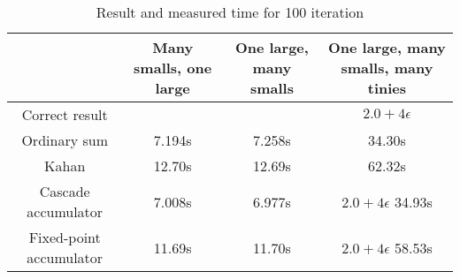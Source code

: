 \documentclass[conference]{IEEEtran}
\begin{document}
\begin{table}[!t]
\renewcommand{\arraystretch}{1.3}
\caption{Result and measured time for 100 iteration}
\label{tab:measurement}
\begin{tabular}{|c|c|c|c|}
\hline
	\parbox[]{1.8cm}{ \center } & 
	\parbox[]{1.7cm}{ \centering Many smalls, one large } & 
	\parbox[]{1.7cm}{ \center One large, many smalls } & 
	\parbox[]{1.7cm}{ \center One large, many smalls, many tinies \linebreak } \\
\hline
	Correct result &
	\parbox[]{1.7cm}{  \linebreak} &
	\parbox[]{1.7cm}{  \linebreak} &
	\parbox[]{1.7cm}{ \center $2.0 + 4\epsilon$ \linebreak} \\
\hline
	Ordinary sum &
	\parbox[]{1.7cm}{  \linebreak 7.194s \linebreak} &
	\parbox[]{1.7cm}{  \linebreak 7.258s \linebreak} &
	\parbox[]{1.7cm}{  \linebreak 34.30s \linebreak} \\
\hline
	Kahan &
	\parbox[]{1.7cm}{  \linebreak 12.70s \linebreak} &
	\parbox[]{1.7cm}{  \linebreak 12.69s \linebreak} &
	\parbox[]{1.7cm}{  \linebreak 62.32s \linebreak} \\
\hline
	\parbox[]{1.7cm}{ \center Cascade \linebreak accumulator \linebreak} &
	\parbox[]{1.7cm}{  \linebreak 7.008s \linebreak} &
	\parbox[]{1.7cm}{  \linebreak 6.977s \linebreak} &
	\parbox[]{1.7cm}{ \center $2.0 + 4\epsilon$ \linebreak 34.93s \linebreak} \\
\hline
	\parbox[]{1.7cm}{ \center Fixed-point \linebreak accumulator \linebreak} &
	\parbox[]{1.7cm}{  \linebreak 11.69s \linebreak} &
	\parbox[]{1.7cm}{  \linebreak 11.70s \linebreak} &
	\parbox[]{1.7cm}{ \center $2.0 + 4\epsilon$ \linebreak 58.53s \linebreak} \\	
\hline
\end{tabular}
\end{table}
\end{document}
